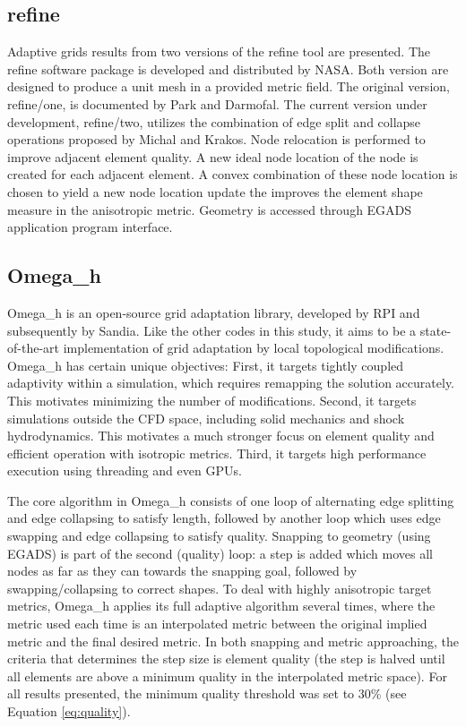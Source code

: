 \documentclass[3p,times,procedia,number]{elsarticle}
\begin{document}
\subsection{refine}

Adaptive grids results from two versions of the refine tool are presented.
The refine software package is developed and distributed by NASA.
Both version are designed to produce a
unit mesh\cite{loseille-alauzet-siamjna-2011-cont-mesh-framework-1}
in a provided metric field.
The original version, refine/one, is documented
by Park and Darmofal.\cite{park-darmofal-parallel-aniso-adapt-aiaa}
The current version under development, refine/two,
utilizes the combination of edge split and collapse operations
proposed by Michal and Krakos.\cite{michal-krakos-aniso-adapt-edge}
Node relocation is performed to improve adjacent element quality.
A new ideal node location of the node is created
for each adjacent element.
A convex combination of these node location is chosen
to yield a new node location update the improves
the element shape measure in the anisotropic
metric.\cite{alauzet-topology-moving-mesh}
Geometry is accessed through EGADS
application program interface.

\subsection{Omega\_h}

Omega\_h is an open-source grid adaptation library,%
\cite{ibanez-phd-thesis-heterogeneous-adapt,%
ibanez-shephard-moving-shared-mem,%
omega_h-website} developed by RPI and subsequently by Sandia.
Like the other codes in this study, it aims to be a state-of-the-art
implementation of grid adaptation by local topological modifications.
Omega\_h has certain unique objectives:
First, it targets tightly coupled adaptivity within a simulation,
which requires remapping the solution accurately.
This motivates minimizing the number of modifications.
Second, it targets simulations outside the CFD space, including
solid mechanics and shock hydrodynamics.
This motivates a much stronger focus on element quality
and efficient operation with isotropic metrics.
Third, it targets high performance execution using threading
and even GPUs.

The core algorithm in Omega\_h consists of one loop of alternating
edge splitting and edge collapsing to satisfy length, followed by another loop
which uses edge swapping and edge collapsing to satisfy quality.
Snapping to geometry (using EGADS) is part of the second (quality) loop:
a step is added which moves all nodes as far as they can towards
the snapping goal, followed by swapping/collapsing to correct shapes.
To deal with highly anisotropic target metrics, Omega\_h applies
its full adaptive algorithm several times, where the metric used
each time is an interpolated metric between the original implied metric
and the final desired metric.
In both snapping and metric approaching, the criteria that determines
the step size is element quality (the step is halved until all elements
are above a minimum quality in the interpolated metric space).
For all results presented, the minimum quality threshold was set to 30\%
(see Equation \ref{eq:quality}).
\end{document}
